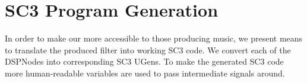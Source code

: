 \section{SC3 Program Generation}

In order to make our \ourTool more accessible to those producing music, 
we present means to translate the produced filter into working SC3 code.
We convert each of the DSPNodes into corresponding SC3 UGens.
To make the generated SC3 code more human-readable variables are used to pass intermediate signals around.

